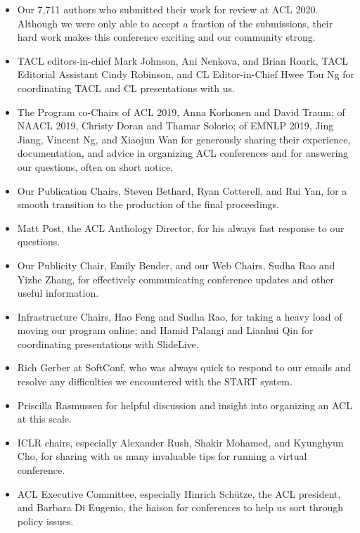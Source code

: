 \begin{itemize}
\item Our 7,711 authors who submitted their work for review at ACL 2020. Although we were only able to accept a fraction of the submissions, their hard work makes this conference exciting and our community strong.

\item TACL editors-in-chief Mark Johnson, Ani Nenkova, and Brian Roark, TACL Editorial
Assistant Cindy Robinson, and CL Editor-in-Chief Hwee Tou Ng for coordinating TACL and CL presentations with us. 

\item The Program co-Chairs of ACL 2019, Anna Korhonen and David Traum; of NAACL 2019, Christy Doran and Thamar Solorio; of EMNLP 2019, Jing Jiang, Vincent Ng, and Xiaojun Wan for generously sharing their experience, documentation, and advice in organizing ACL conferences and for answering our questions, often on short notice.  

\item Our Publication Chairs, Steven Bethard, Ryan Cotterell, and Rui Yan, for a smooth transition to the production of the final proceedings.

\item Matt Post, the ACL Anthology Director, for his always fast response to our questions. 

\item Our Publicity Chair, Emily Bender, and our Web Chairs, Sudha Rao and Yizhe Zhang, for effectively communicating conference updates and other useful information.

\item Infrastructure Chairs, Hao Feng and Sudha Rao, for taking a heavy load of moving our program online; and Hamid Palangi and Lianhui Qin for coordinating presentations with SlideLive. 

\item Rich Gerber at SoftConf, who was always quick to respond to our emails and resolve any difficulties we encountered with the START system. 

\item Priscilla Rasmussen for helpful discussion and insight into organizing an ACL at this scale. 

\item ICLR chairs, especially  Alexander Rush, Shakir Mohamed, and Kyunghyun Cho, for sharing with us many invaluable tips for running a virtual conference. 

\item ACL Executive Committee, especially Hinrich Schütze, the ACL president, and Barbara Di Eugenio, the liaison for conferences to help us sort through policy issues.


\end{itemize}
